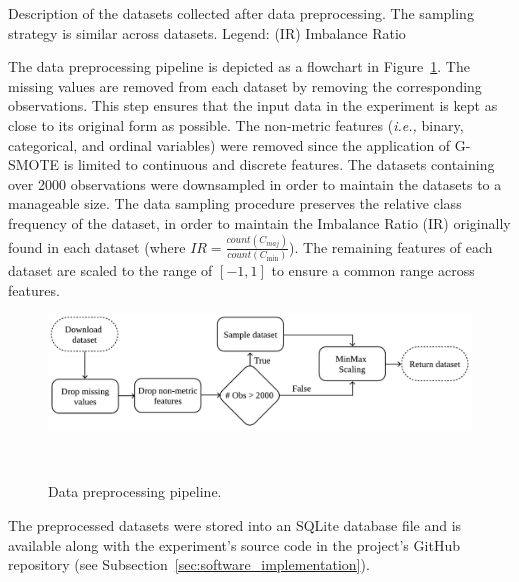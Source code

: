 \documentclass[10pt,journal,compsoc]{IEEEtran}
\begin{document}
\begin{table}[H]
    \centering
    \setlength{\tabcolsep}{2pt}
    \caption{\label{tab:datasets_description}
        Description of the datasets collected after data preprocessing. The
        sampling strategy is similar across datasets. Legend: (IR) Imbalance
        Ratio
    }
\end{table}

The data preprocessing pipeline is depicted as a flowchart in
Figure~\ref{fig:data_preprocessing}. The missing values are removed from each
dataset by removing the corresponding observations. This step ensures that the
input data in the experiment is kept as close to its original form as
possible. The non-metric features (\textit{i.e.,} binary, categorical, and
ordinal variables) were removed since the application of G-SMOTE is limited to
continuous and discrete features. The datasets containing over 2000
observations were downsampled in order to maintain the datasets to a
manageable size. The data sampling procedure preserves the relative class
frequency of the dataset, in order to maintain the Imbalance Ratio (IR)
originally found in each dataset (where $IR =
\frac{count(C_{maj})}{count(C_{\min})}$). The remaining features of each
dataset are scaled to the range of $[-1, 1]$ to ensure a common range across
features.

\begin{figure}[H]
	\centering
	\includegraphics[width=1\linewidth]{../analysis/data_preprocessing}
    \caption{%
        Data preprocessing pipeline.
    }~\label{fig:data_preprocessing}
\end{figure}

The preprocessed datasets were stored into an SQLite database file and is
available along with the experiment's source code in the project's GitHub
repository (see Subsection~\ref{sec:software_implementation}).
 
\end{document}

